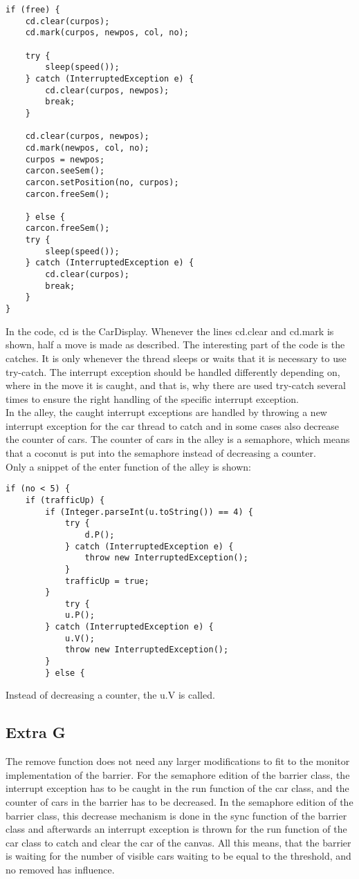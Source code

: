 \begin{lstlisting}
if (free) {
	cd.clear(curpos);
	cd.mark(curpos, newpos, col, no);

	try {
		sleep(speed());
	} catch (InterruptedException e) {
		cd.clear(curpos, newpos);
		break;
	}

	cd.clear(curpos, newpos);
	cd.mark(newpos, col, no);
	curpos = newpos;
	carcon.seeSem();
	carcon.setPosition(no, curpos);
	carcon.freeSem();

	} else {
	carcon.freeSem();
	try {
		sleep(speed());
	} catch (InterruptedException e) {
		cd.clear(curpos);
		break;
	}
}
\end{lstlisting}
\vspace{.8cm}

In the code, cd is the CarDisplay. Whenever the lines cd.clear and cd.mark is shown, half a move is made as described. The interesting part of the code is the catches. It is only whenever the thread sleeps or waits that it is necessary to use try-catch. The interrupt exception should be handled differently depending on, where in the move it is caught, and that is, why there are used try-catch several times to ensure the right handling of the specific interrupt exception. \\

In the alley, the caught interrupt exceptions are handled by throwing a new interrupt exception for the car thread to catch and in some cases also decrease the counter of cars. The counter of cars in the alley is a semaphore, which means that a coconut is put into the semaphore instead of decreasing a counter. \\
Only a snippet of the enter function of the alley is shown:

\begin{lstlisting}
if (no < 5) {
	if (trafficUp) {
		if (Integer.parseInt(u.toString()) == 4) {
			try {
				d.P();
			} catch (InterruptedException e) {
				throw new InterruptedException();
			}
			trafficUp = true;
		}
			try {
			u.P();
		} catch (InterruptedException e) {
			u.V();
			throw new InterruptedException();
		}
		} else {
\end{lstlisting}
\vspace{.8cm}

Instead of decreasing a counter, the u.V is called.

\subsection{Extra G}
The remove function does not need any larger modifications to fit to the monitor implementation of the barrier. For the semaphore edition of the barrier class, the interrupt exception has to be caught in the run function of the car class, and the counter of cars in the barrier has to be decreased. In the semaphore edition of the barrier class, this decrease mechanism is done in the sync function of the barrier class and afterwards an interrupt exception is thrown for the run function of the car class to catch and clear the car of the canvas. All this means, that the barrier is waiting for the number of visible cars waiting to be equal to the threshold, and no removed has influence.